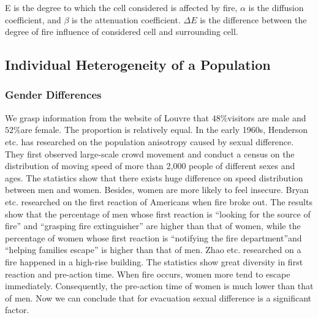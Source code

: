\documentclass{mcmthesis}
\begin{document}
    E is the degree to which the cell considered is affected by fire, $\alpha$ is the diffusion coefficient, and $\beta$ is the attenuation coefficient. $\Delta E$ is the difference between the degree of fire influence of considered cell and surrounding cell.

\subsection{Individual Heterogeneity of a Population}
\subsubsection{Gender Differences}
 We grasp information from the website of Louvre that $48\%$visitors are male and $52\%$are female. \cite{gender1} The proportion is relatively equal. In the early 1960s, Henderson etc. \cite{gender2}has researched on the population anisotropy caused by sexual difference. They first observed large-scale crowd movement and conduct a census on the distribution of moving speed of more than 2,000 people of different sexes and ages. The statistics show that there exists huge difference on speed distribution between men and women. Besides, women are more likely to feel insecure. Bryan etc. \cite{gender3} researched on the first reaction of Americans when fire broke out. The results show that the percentage of men whose first reaction is “looking for the source of fire” and “grasping fire extinguisher” are higher than that of women, while the percentage of women whose first reaction is “notifying the fire department”and “helping families escape” is higher than that of men. Zhao etc. \cite{gender4} researched on a fire happened in a high-rise building. The statistics show great diversity in first reaction and pre-action time. When fire occurs, women more tend to escape immediately. Consequently, the pre-action time of women is much lower than that of men. Now we can conclude that for evacuation sexual difference is a significant factor.
\end{document}

